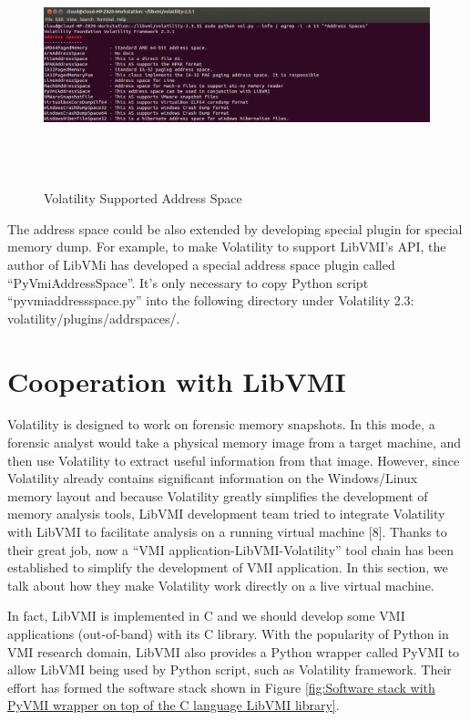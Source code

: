 \begin{figure}[htbp]
	\centering
		\includegraphics[width=14cm, height= 7cm ]{Figures/Figure28.png}
	\caption[Volatility Supported Address Space]{Volatility Supported Address Space}
	\label{fig:Volatility Supported Address Space}
\end{figure}

The address space could be also extended by developing special plugin for special memory dump. 
For example, to make Volatility to support LibVMI’s API, the author of LibVMi has developed a special address space plugin called 
“PyVmiAddressSpace”. It’s only necessary to copy Python script “pyvmiaddressspace.py” into the following directory under 
Volatility 2.3: volatility/plugins/addrspaces/.

\section{Cooperation with LibVMI}
Volatility is designed to work on forensic memory snapshots. In this mode, a forensic analyst would take a physical memory image from
a target machine, and then use Volatility to extract useful information from that image. However, since Volatility already contains 
significant information on the Windows/Linux memory layout and because Volatility greatly simplifies the development of memory analysis 
tools, LibVMI development team tried to integrate Volatility with LibVMI to facilitate analysis on a running virtual machine [8]. Thanks
to their great job, now a “VMI application-LibVMI-Volatility” tool chain has been established to simplify the development of VMI application.
In this section, we talk about how they make Volatility work directly on a live virtual machine.

In fact, LibVMI is implemented in C and we should develop some VMI applications (out-of-band) with its C library. With the popularity of 
Python in VMI research domain, LibVMI also provides a Python wrapper called PyVMI to allow LibVMI being used by Python script, such as 
Volatility framework. Their effort has formed the software stack shown in Figure \ref{fig:Software stack with PyVMI wrapper on top of the C language LibVMI library}.

